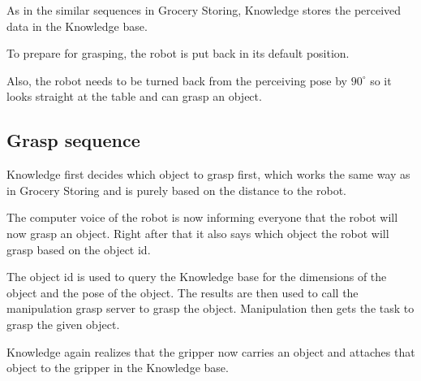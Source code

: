 \documentclass[main.tex]{subfiles}
\begin{document}
	\begin{knowledge}
	As in the similar sequences in Grocery Storing, Knowledge stores the perceived data in the Knowledge base.
	\end{knowledge}
	
	\begin{manipulation}
	To prepare for grasping, the robot is put back in its default position.
	\end{manipulation}
	
	
	
	\begin{navigation}
	Also, the robot needs to be turned back from the perceiving pose by $90^\circ$ so it looks straight at the table and can grasp an object.
	\end{navigation}
	
	\subsection{Grasp sequence}\label{clean_up_grasp_seq}
	
	\begin{knowledge}
	Knowledge first decides which object to grasp first, which works the same way as in Grocery Storing and is purely based on the distance to the robot.
	\end{knowledge}
	
	\begin{nlp}
	The computer voice of the robot is now informing everyone that the robot will now grasp an object. Right after that it also says which object the robot will grasp based on the object id.
	\end{nlp}
	
	\begin{manipulation}
	The object id is used to query the Knowledge base for the dimensions of the object and the pose of the object. The results are then used to call the manipulation grasp server to grasp the object. Manipulation then gets the task to grasp the given object.
	\end{manipulation}
	 \begin{knowledge}
	 Knowledge again realizes that the gripper now carries an object and attaches that object to the gripper in the Knowledge base.
	 \end{knowledge}
	 
\end{document}
